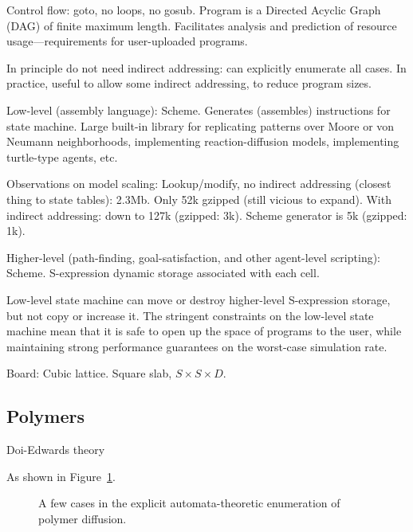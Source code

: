 \documentclass{acm_proc_article-sp}
\begin{document}
Control flow: goto, no loops, no gosub. Program is a Directed Acyclic Graph (DAG) of finite maximum length.
Facilitates analysis and prediction of resource usage---requirements for user-uploaded programs.

In principle do not need indirect addressing: can explicitly enumerate all cases.
In practice, useful to allow some indirect addressing, to reduce program sizes.

Low-level (assembly language):
Scheme. Generates (assembles) instructions for state machine.
Large built-in library for replicating patterns over Moore or von Neumann neighborhoods,
implementing reaction-diffusion models, implementing turtle-type agents, etc.

Observations on model scaling:
Lookup/modify, no indirect addressing (closest thing to state tables): 2.3Mb.
Only 52k gzipped (still vicious to expand).
With indirect addressing: down to 127k (gzipped: 3k).
Scheme generator is 5k (gzipped: 1k).


Higher-level (path-finding, goal-satisfaction, and other agent-level scripting):
Scheme. S-expression dynamic storage associated with each cell.

Low-level state machine can move or destroy higher-level S-expression storage, but not copy or increase it.
The stringent constraints on the low-level state machine mean that it is safe to open up the space of programs to the user,
while maintaining strong performance guarantees on the worst-case simulation rate.

Board:
Cubic lattice.
Square slab, $S \times S \times D$.


\subsection{Polymers}

Doi-Edwards theory \cite{DoiEdwards1988}

As shown in Figure~\ref{fig:polymer}.

\begin{figure}
\caption{
\label{fig:polymer}
A few cases in the explicit automata-theoretic enumeration of polymer diffusion.
}
\end{figure}
\end{document}
